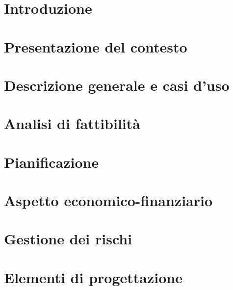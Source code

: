 

\def\DOCUMENTO 		{Piano di Progetto\\}
\def\VERSIONE 		{1.0.0\\}

\def\REDATTORI		{}

\def\VERIFICATORI	{}

\def\RESPONSABILE	{}

\def\USO			{}

\def\DISTRIBUZIONE	{\GRUPPO{}\\
					& \COMMITTENTE{}\\}

\def\DESCRIZIONE	{}

\def\INDICE		{true} 		%
\def\TABELLE	{true} 		%
\def\FIGURE		{true} 		%




\section{Introduzione}

\newpage

\section{Presentazione del contesto}

\newpage

\section{Descrizione generale e casi d'uso}

\newpage

\section{Analisi di fattibilità}

\newpage

\section{Pianificazione}

\newpage

\section{Aspetto economico-finanziario}

\newpage

\section{Gestione dei rischi}

\newpage

\section{Elementi di progettazione}




